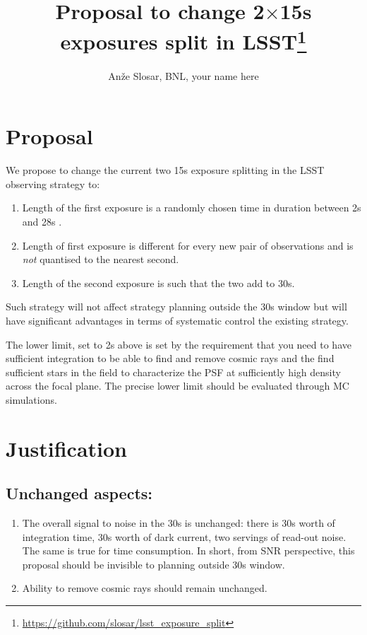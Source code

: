 \documentclass[12pt, a4paper]{article}
\begin{document}
\title{Proposal to change 2$\times$15s exposures split in LSST\thanks{\url{https://github.com/slosar/lsst_exposure_split}}}
\author{An\v{z}e Slosar, BNL, your name here}


\maketitle

\section*{Proposal}

We propose to change the current two 15s exposure splitting in the
LSST observing strategy to:

\begin{enumerate}
\item Length of the first exposure is a randomly chosen time in
  duration between 2s and 28s .

\item Length of first exposure is different for every new pair of
  observations and is \emph{not} quantised to the nearest second.

\item Length of the second exposure is such that the two add to 30s.
\end{enumerate}

Such strategy will not affect strategy planning outside the 30s window
but will have significant advantages in terms of systematic control
the existing strategy.

The lower limit, set to 2s above is set by the requirement that you
need to have sufficient integration to be able to find and remove
cosmic rays and the find sufficient stars in the field to characterize
the PSF at sufficiently high density across the focal plane. The
precise lower limit should be evaluated through MC simulations.




\section*{Justification}

\subsection*{Unchanged aspects:}
\begin{enumerate}

\item The overall signal to noise in the 30s is unchanged: there is
  30s worth of integration time, 30s worth of dark current, two servings
  of read-out noise. The same is true for time consumption. In short,
  from SNR perspective, this proposal should be invisible to planning
  outside 30s window.

\item Ability to remove cosmic rays should remain unchanged.
\end{enumerate}
\end{document}
